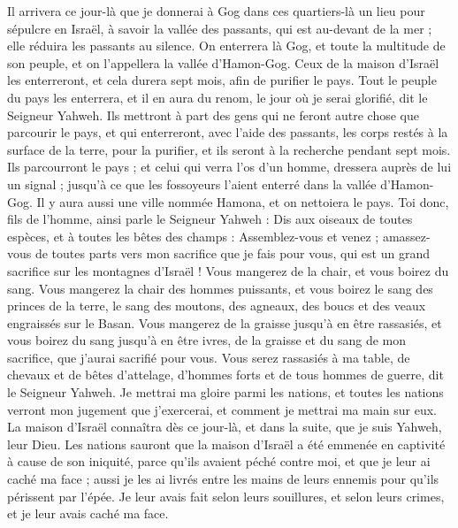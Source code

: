 \begin{multicols}{2}
Il arrivera ce jour-là que je donnerai à Gog dans ces quartiers-là un lieu pour sépulcre en Israël, à savoir la vallée des passants, qui est au-devant de la mer ; elle réduira les passants au silence. On enterrera là Gog, et toute la multitude de son peuple, et on l'appellera la vallée d'Hamon-Gog.
Ceux de la maison d'Israël les enterreront, et cela durera sept mois, afin de purifier le pays.
Tout le peuple du pays les enterrera, et il en aura du renom, le jour où je serai glorifié, dit le Seigneur Yahweh.
Ils mettront à part des gens qui ne feront autre chose que parcourir le pays, et qui enterreront, avec l'aide des passants, les corps restés à la surface de la terre, pour la purifier, et ils seront à la recherche pendant sept mois.
Ils parcourront le pays ; et celui qui verra l'os d'un homme, dressera auprès de lui un signal ; jusqu'à ce que les fossoyeurs l'aient enterré dans la vallée d'Hamon-Gog.
Il y aura aussi une ville nommée Hamona, et on nettoiera le pays.
Toi donc, fils de l'homme, ainsi parle le Seigneur Yahweh : Dis aux oiseaux de toutes espèces, et à toutes les bêtes des champs : Assemblez-vous et venez ; amassez-vous de toutes parts vers mon sacrifice que je fais pour vous, qui est un grand sacrifice sur les montagnes d'Israël ! Vous mangerez de la chair, et vous boirez du sang.
Vous mangerez la chair des hommes puissants, et vous boirez le sang des princes de la terre, le sang des moutons, des agneaux, des boucs et des veaux engraissés sur le Basan.
Vous mangerez de la graisse jusqu'à en être rassasiés, et vous boirez du sang jusqu'à en être ivres, de la graisse et du sang de mon sacrifice, que j'aurai sacrifié pour vous.
Vous serez rassasiés à ma table, de chevaux et de bêtes d'attelage, d'hommes forts et de tous hommes de guerre, dit le Seigneur Yahweh.
Je mettrai ma gloire parmi les nations, et toutes les nations verront mon jugement que j'exercerai, et comment je mettrai ma main sur eux.
La maison d'Israël connaîtra dès ce jour-là, et dans la suite, que je suis Yahweh, leur Dieu.
Les nations sauront que la maison d'Israël a été emmenée en captivité à cause de son iniquité, parce qu'ils avaient péché contre moi, et que je leur ai caché ma face ; aussi je les ai livrés entre les mains de leurs ennemis pour qu'ils périssent par l'épée.
Je leur avais fait selon leurs souillures, et selon leurs crimes, et je leur avais caché ma face.

\end{multicols}
